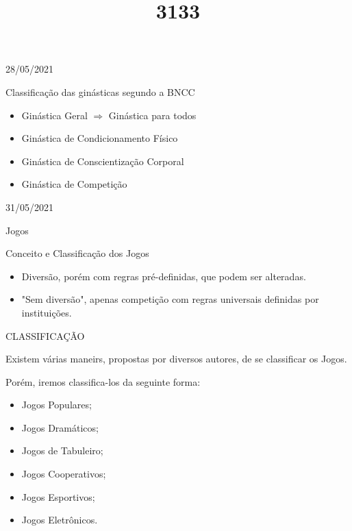 \documentclass{SchoolBook}
\begin{document}
    \begin{day}{28/05/2021}
        \title{3}{Classificação das ginásticas segundo a BNCC}
        
        \begin{itemize}[nosep]
            \item Ginástica Geral $\Longrightarrow$ Ginástica para todos
            \item Ginástica de Condicionamento Físico
            \item Ginástica de Conscientização Corporal
            \item Ginástica de Competição
        \end{itemize}
    \end{day}
    
    \begin{day}{31/05/2021}
        \title{1}{Jogos}
        \title{3}{Conceito e Classificação dos Jogos}
        
        \begin{itemize}[nosep]
            \item Diversão, porém com regras pré-definidas, que podem ser alteradas.
            \item "Sem diversão", apenas competição com regras universais definidas por instituições.
        \end{itemize}
        
        \title{3}{CLASSIFICAÇÃO}
        
        Existem várias maneirs, propostas por diversos autores, de se classificar os Jogos.
        
        Porém, iremos classifica-los da seguinte forma:
        
        \begin{itemize}[nosep]
            \item Jogos Populares;
            \item Jogos Dramáticos;
            \item Jogos de Tabuleiro;
            \item Jogos Cooperativos;
            \item Jogos Esportivos;
            \item Jogos Eletrônicos.
        \end{itemize}
    \end{day}
    
\end{document}

